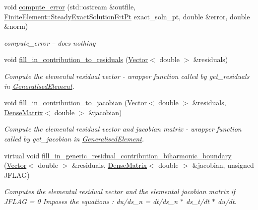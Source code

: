 \begin{DoxyCompactItemize}
void \hyperlink{classoomph_1_1BiharmonicFluidBoundaryElement_ac49d98d2b2633a3adf86489e246845a9}{compute\+\_\+error} (std\+::ostream \&outfile, \hyperlink{classoomph_1_1FiniteElement_a690fd33af26cc3e84f39bba6d5a85202}{Finite\+Element\+::\+Steady\+Exact\+Solution\+Fct\+Pt} exact\+\_\+soln\+\_\+pt, double \&error, double \&norm)
\begin{DoxyCompactList}\small\item\em compute\+\_\+error -- does nothing \end{DoxyCompactList}\item 
void \hyperlink{classoomph_1_1BiharmonicFluidBoundaryElement_a448d3143a92e1f67b3c829c02a4f28c3}{fill\+\_\+in\+\_\+contribution\+\_\+to\+\_\+residuals} (\hyperlink{classoomph_1_1Vector}{Vector}$<$ double $>$ \&residuals)
\begin{DoxyCompactList}\small\item\em Compute the elemental residual vector -\/ wrapper function called by get\+\_\+residuals in \hyperlink{classoomph_1_1GeneralisedElement}{Generalised\+Element}. \end{DoxyCompactList}\item 
void \hyperlink{classoomph_1_1BiharmonicFluidBoundaryElement_a9bc299d6f1c70851999b9e9b72c88602}{fill\+\_\+in\+\_\+contribution\+\_\+to\+\_\+jacobian} (\hyperlink{classoomph_1_1Vector}{Vector}$<$ double $>$ \&residuals, \hyperlink{classoomph_1_1DenseMatrix}{Dense\+Matrix}$<$ double $>$ \&jacobian)
\begin{DoxyCompactList}\small\item\em Compute the elemental residual vector and jacobian matrix -\/ wrapper function called by get\+\_\+jacobian in \hyperlink{classoomph_1_1GeneralisedElement}{Generalised\+Element}. \end{DoxyCompactList}\item 
virtual void \hyperlink{classoomph_1_1BiharmonicFluidBoundaryElement_acb845b4b7fe946233d9f656754fa3eac}{fill\+\_\+in\+\_\+generic\+\_\+residual\+\_\+contribution\+\_\+biharmonic\+\_\+boundary} (\hyperlink{classoomph_1_1Vector}{Vector}$<$ double $>$ \&residuals, \hyperlink{classoomph_1_1DenseMatrix}{Dense\+Matrix}$<$ double $>$ \&jacobian, unsigned J\+F\+L\+AG)
\begin{DoxyCompactList}\small\item\em Computes the elemental residual vector and the elemental jacobian matrix if J\+F\+L\+AG = 0 Imposes the equations \+: du/ds\+\_\+n = dt/ds\+\_\+n $\ast$ ds\+\_\+t/dt $\ast$ du/dt. \end{DoxyCompactList}\end{DoxyCompactItemize}
